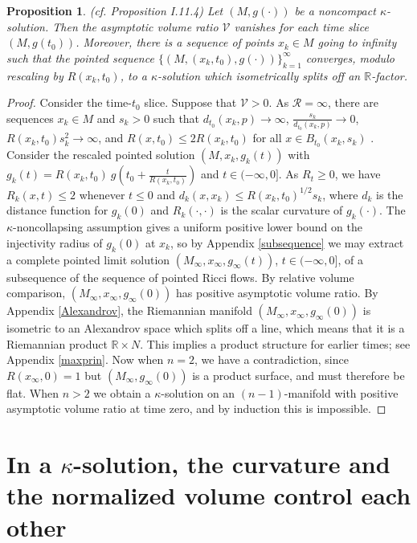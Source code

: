 \documentclass[12pt]{amsart}
\newcommand{\R}{{\mathbb R}}
\newcommand{\ra}{\rightarrow}
\numberwithin{equation}{section}
\theoremstyle{plain}
\newtheorem{proposition}[equation]{Proposition}
\theoremstyle{definition}
\theoremstyle{remark}
\begin{document}
\begin{proposition} (cf. Proposition I.11.4) \label{propI.11.4}
Let $(M,g(\cdot))$ be a noncompact $\kappa$-solution.
Then the asymptotic volume ratio ${\mathcal V}$
vanishes for each time slice $(M,g(t_0))$.  Moreover, there is a 
sequence of points $x_k\in M$ going to infinity such that the
pointed sequence $\{ (M,(x_k,t_0),g(\cdot)) \}_{k=1}^\infty$ converges, 
modulo rescaling
by $R(x_k,t_0)$, to a $\kappa$-solution which isometrically splits off 
an $\R$-factor.
\end{proposition}
\begin{proof}
Consider the time-$t_0$ slice.
Suppose that ${\mathcal V}>0$.
As ${\mathcal R}=\infty$,  there
are sequences $x_k\in M$ and  $s_k>0$  
such that $d_{t_0}(x_k,p)\ra \infty$, $\frac{s_k}{d_{t_0}(x_k,p)}\ra 0$,
$R(x_k, t_0 )s_k^2\ra\infty$, and $R(x, t_0)\leq 2R(x_k, t_0)$ for all
$x\in B_{t_0}(x_k,s_k)$
\cite[Lemma 22.2]{Hamilton}.
Consider the rescaled pointed solution
$(M,x_k,g_k(t))$ with
$g_k(t) =R(x_k,t_0) \: g(t_0 + \frac{t}{R(x_k,t_0)})$ and $t\in (-\infty,0]$.
As $R_t \ge 0$, we have
$R_k(x,t)\leq 2$ whenever $t\leq 0$ and
$d_k(x,x_k)\leq R(x_k, t_0)^{1/2} s_k$, 
where $d_k$ is the distance function  for $g_k(0)$
and $R_k(\cdot,\cdot)$ is the scalar curvature of $g_k(\cdot)$. 
The $\kappa$-noncollapsing assumption gives a uniform positive
lower bound on the
injectivity radius of $g_k(0)$ at $x_k$,
so by Appendix \ref{subsequence}
we may extract a complete pointed limit solution 
$(M_\infty,x_\infty,g_\infty(t))$, $t\in (-\infty,0]$, of a subsequence of
the sequence of pointed Ricci flows.
By relative volume comparison, $(M_\infty,x_\infty,g_\infty(0))$
has positive asymptotic volume ratio.  By Appendix \ref{Alexandrov},
the Riemannian manifold
$(M_\infty,x_\infty,g_\infty(0))$ is isometric to an Alexandrov
space which splits off a line, which means that it is a Riemannian 
product $\R\times N$. This implies a product structure for
earlier times; 
see Appendix \ref{maxprin}.
Now when $n=2$, we have a contradiction,
since $R(x_\infty,0)=1$ but $(M_\infty,g_\infty(0))$ is a product
surface, and must therefore be flat.  When $n>2$ we obtain
a $\kappa$-solution on an $(n-1)$-manifold with positive asymptotic
volume ratio at time zero, and by induction this is impossible.
\end{proof}




\section{In a $\kappa$-solution, the curvature and the normalized
volume control each other}
\end{document}
